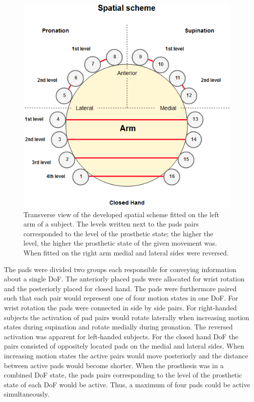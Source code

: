 \begin{figure}[h]                 
	\includegraphics[width=.9\textwidth]{figures/El_array_spatial}  
	\caption{Transverse view of the developed spatial scheme fitted on the left arm of a subject. The levels written next to the pads pairs corresponded to the level of the prosthetic state; the higher the level, the higher the prosthetic state of the given movement was. When fitted on the right arm medial and lateral sides were reversed.}
	\label{fig:pa:spatial} 
\end{figure}
The pads were divided two groups each responsible for conveying information about a single DoF. The anteriorly placed pads were allocated for wrist rotation and the posteriorly placed for closed hand. The pads were furthermore paired such that each pair would represent one of four motion states in one DoF. For wrist rotation the pads were connected in side by side pairs. For right-handed subjects the activation of pad pairs would rotate laterally when increasing motion states during supination and rotate medially during pronation. The reversed activation was apparent for left-handed subjects. For the closed hand DoF the pairs consisted of oppositely located pads on the medial and lateral sides. When increasing motion states the active pairs would move posteriorly and the distance between active pads would become shorter. When the prosthesis was in a combined DoF state, the pads pairs corresponding to the level of the prosthetic state of each DoF would be active. Thus, a maximum of four pads could be active simultaneously. 

